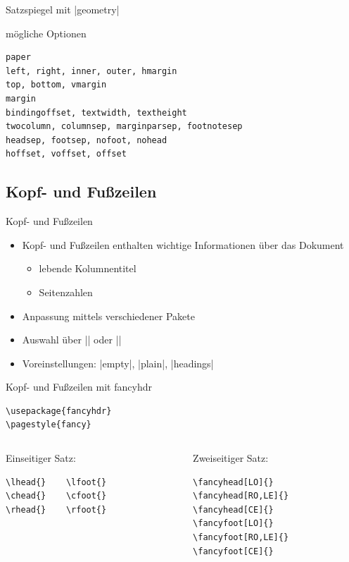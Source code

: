 \documentclass[
	vorläufig=true,
	datum=2016-10-28,
	titel={Allgemeine Formatierung und Pakete},
	web=true,
]{../tex/latexkurs-slides}
\begin{document}
\begin{frame}[fragile,t]{Satzspiegel mit |geometry|}
	\vspace{-1.5em}
	\begin{block}{mögliche Optionen}
		\vspace{-1em}
\begin{verbatim}
paper
left, right, inner, outer, hmargin
top, bottom, vmargin
margin
bindingoffset, textwidth, textheight
twocolumn, columnsep, marginparsep, footnotesep
headsep, footsep, nofoot, nohead
hoffset, voffset, offset
\end{verbatim}
	\end{block}
\end{frame}



\subsection{Kopf- und Fußzeilen}
\begin{frame}[fragile, t]{Kopf- und Fußzeilen}
	\begin{itemize}
		\item Kopf- und Fußzeilen enthalten wichtige Informationen über das Dokument 
		\begin{itemize}
			\item lebende Kolumnentitel
			\item Seitenzahlen
		\end{itemize}
		\item Anpassung mittels verschiedener Pakete
		\item Auswahl über || oder || 
		\item Voreinstellungen: |empty|, |plain|, |headings|
	\end{itemize}
\end{frame}


\begin{frame}[fragile, t]{Kopf- und Fußzeilen mit fancyhdr}
\begin{lstlisting}
\usepackage{fancyhdr}
\pagestyle{fancy}
\end{lstlisting}
	\begin{columns}
		\begin{column}{.45\textwidth}
			\vspace{-3.87em}
			
			Einseitiger Satz:
\begin{lstlisting}
\lhead{}    \lfoot{}
\chead{}    \cfoot{}
\rhead{}    \rfoot{}
\end{lstlisting}
		\end{column}
		\begin{column}{.45\textwidth}
		Zweiseitiger Satz:
\begin{lstlisting}
\fancyhead[LO]{}
\fancyhead[RO,LE]{}
\fancyhead[CE]{}
\fancyfoot[LO]{}
\fancyfoot[RO,LE]{}
\fancyfoot[CE]{}
\end{lstlisting}
		\end{column}
	\end{columns}
\end{frame}
\end{document}
